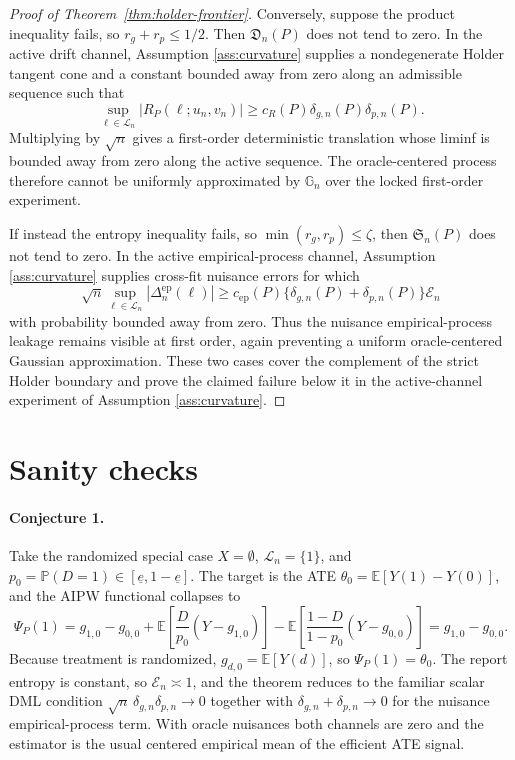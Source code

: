 \documentclass[11pt]{article}
\newcommand{\E}{\mathbb{E}}
\renewcommand{\Pr}{\mathbb{P}}
\theoremstyle{definition}
\theoremstyle{plain}
\theoremstyle{remark}
\begin{document}
\begin{proof}[Proof of Theorem~\ref{thm:holder-frontier}]
Conversely, suppose the product inequality fails, so \(r_g+r_p\le1/2\).  Then
\(\mathfrak D_n(P)\) does not tend to zero.  In the active drift channel,
Assumption \ref{ass:curvature} supplies a nondegenerate Holder tangent cone
and a constant bounded away from zero along an admissible sequence such that
\[
\sup_{\ell\in\mathcal L_n}|R_P(\ell;u_n,v_n)|
\ge c_R(P)\delta_{g,n}(P)\delta_{p,n}(P).
\]
Multiplying by \(\sqrt n\) gives a first-order deterministic translation whose
liminf is bounded away from zero along the active sequence.  The oracle-centered
process therefore cannot be uniformly approximated by \(\mathbb G_n\) over the
locked first-order experiment.

If instead the entropy inequality fails, so \(\min(r_g,r_p)\le\zeta\), then
\(\mathfrak S_n(P)\) does not tend to zero.  In the active empirical-process
channel, Assumption \ref{ass:curvature} supplies cross-fit nuisance errors for
which
\[
\sqrt n\sup_{\ell\in\mathcal L_n}|\Delta_n^{\mathrm{ep}}(\ell)|
\ge
c_{\mathrm{ep}}(P)\{\delta_{g,n}(P)+\delta_{p,n}(P)\}\mathcal{E}_n
\]
with probability bounded away from zero.  Thus the nuisance empirical-process
leakage remains visible at first order, again preventing a uniform
oracle-centered Gaussian approximation.  These two cases cover the complement
of the strict Holder boundary and prove the claimed failure below it in the
active-channel experiment of Assumption \ref{ass:curvature}.
\end{proof}

\section{Sanity checks}
\paragraph{Conjecture 1.}
Take the randomized special case \(X=\emptyset\), \(\mathcal{L}_n=\{1\}\), and
\(p_0=\Pr(D=1)\in[\underline e,1-\underline e]\).  The target is the ATE
\(\theta_0= \E[Y(1)-Y(0)]\), and the AIPW functional collapses to
\[
\Psi_P(1)=g_{1,0}-g_{0,0}
+\E\!\left[\frac{D}{p_0}(Y-g_{1,0})\right]
-\E\!\left[\frac{1-D}{1-p_0}(Y-g_{0,0})\right]
=g_{1,0}-g_{0,0}.
\]
Because treatment is randomized, \(g_{d,0}=\E[Y(d)]\), so
\(\Psi_P(1)=\theta_0\).  The report entropy is constant, so
\(\mathcal{E}_n\asymp1\), and the theorem reduces to the familiar scalar DML
condition
\(\sqrt n\,\delta_{g,n}\delta_{p,n}\to0\) together with
\(\delta_{g,n}+\delta_{p,n}\to0\) for the nuisance empirical-process term.
With oracle nuisances both channels are zero and the estimator is the usual
centered empirical mean of the efficient ATE signal.
\end{document}
